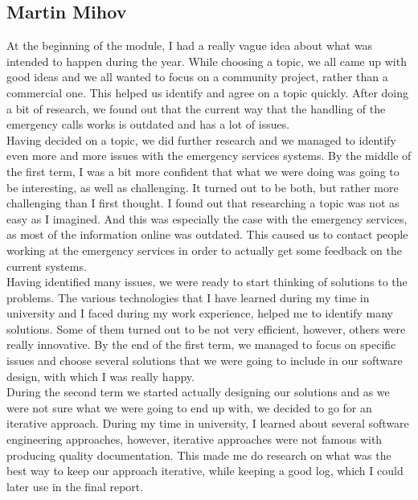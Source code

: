 \documentclass[]{article}
\begin{document}
    \subsection{Martin Mihov}
    At the beginning of the module, I had a really vague idea about what was intended to happen during the year. While choosing a topic, we all came up with good ideas and we all wanted to focus on a community project, rather than a commercial one. This helped us identify and agree on a topic quickly. After doing a bit of research, we found out that the current way that the handling of the emergency calls works is outdated and has a lot of issues.\\

Having decided on a topic, we did further research and we managed to identify even more and more issues with the emergency services systems. By the middle of the first term, I was a bit more confident that what we were doing was going to be interesting, as well as challenging. It turned out to be both, but rather more challenging than I first thought. I found out that researching a topic was not as easy as I imagined. And this was especially the case with the emergency services, as most of the information online was outdated. This caused us to contact people working at the emergency services in order to actually get some feedback on the current systems.\\

Having identified many issues, we were ready to start thinking of solutions to the problems. The various technologies that I have learned during my time in university and I faced during my work experience, helped me to identify many solutions. Some of them turned out to be not very efficient, however, others were really innovative. By the end of the first term, we managed to focus on specific issues and choose several solutions that we were going to include in our software design, with which I was really happy.\\

During the second term we started actually designing our solutions and as we were not sure what we were going to end up with, we decided to go for an iterative approach. During my time in university, I learned about several software engineering approaches, however, iterative approaches were not famous with producing quality documentation. This made me do research on what was the best way to keep our approach iterative, while keeping a good log, which I could later use in the final report.\\
\end{document}
